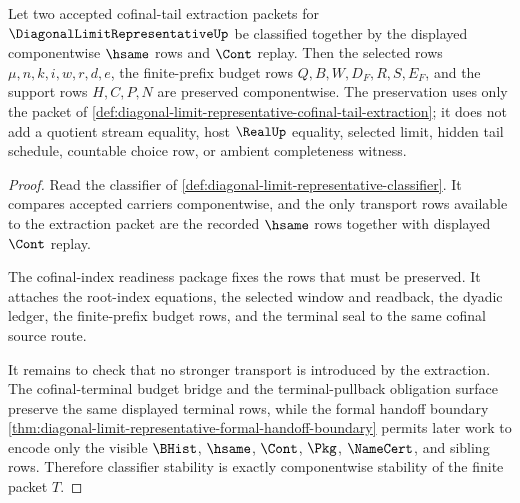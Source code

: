 \begin{theorem}
\label{thm:diagonal-limit-representative-cofinal-tail-classifier-stability}
Let two accepted cofinal-tail extraction packets for $\DiagonalLimitRepresentativeUp$ be classified together by the displayed componentwise $\hsame$ rows and $\Cont$ replay. Then the selected rows $\mu,n,k,i,w,r,d,e$, the finite-prefix budget rows $Q,B,W,D_F,R,S,E_F$, and the support rows $H,C,P,N$ are preserved componentwise. The preservation uses only the packet of \autoref{def:diagonal-limit-representative-cofinal-tail-extraction}; it does not add a quotient stream equality, host $\RealUp$ equality, selected limit, hidden tail schedule, countable choice row, or ambient completeness witness.
\end{theorem}
\begin{proof}
Read the classifier of \autoref{def:diagonal-limit-representative-classifier}. It compares accepted carriers componentwise, and the only transport rows available to the extraction packet are the recorded $\hsame$ rows together with displayed $\Cont$ replay.

The cofinal-index readiness package fixes the rows that must be preserved. It attaches the root-index equations, the selected window and readback, the dyadic ledger, the finite-prefix budget rows, and the terminal seal to the same cofinal source route.

It remains to check that no stronger transport is introduced by the extraction. The cofinal-terminal budget bridge and the terminal-pullback obligation surface preserve the same displayed terminal rows, while the formal handoff boundary \autoref{thm:diagonal-limit-representative-formal-handoff-boundary} permits later work to encode only the visible $\BHist$, $\hsame$, $\Cont$, $\Pkg$, $\NameCert$, and sibling rows. Therefore classifier stability is exactly componentwise stability of the finite packet $T$.
\end{proof}

